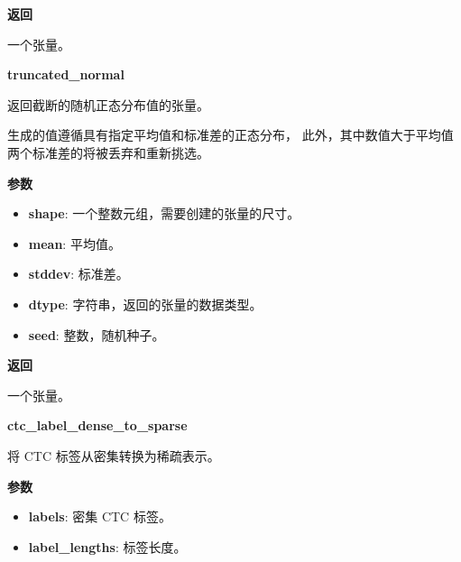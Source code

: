 \textbf{返回}

一个张量。


\textbf{truncated\_normal}\label{truncatedux5fnormal}

\begin{Shaded}
\begin{Highlighting}[]
\OperatorTok{=}\OperatorTok{=}\OperatorTok{=}\OperatorTok{=}\NormalTok{)}
\end{Highlighting}
\end{Shaded}

返回截断的随机正态分布值的张量。

生成的值遵循具有指定平均值和标准差的正态分布，
此外，其中数值大于平均值两个标准差的将被丢弃和重新挑选。

\textbf{参数}

\begin{itemize}
\tightlist
\item
  \textbf{shape}: 一个整数元组，需要创建的张量的尺寸。
\item
  \textbf{mean}: 平均值。
\item
  \textbf{stddev}: 标准差。
\item
  \textbf{dtype}: 字符串，返回的张量的数据类型。
\item
  \textbf{seed}: 整数，随机种子。
\end{itemize}

\textbf{返回}

一个张量。


\textbf{ctc\_label\_dense\_to\_sparse}\label{ctcux5flabelux5fdenseux5ftoux5fsparse}

\begin{Shaded}
\begin{Highlighting}[]
\end{Highlighting}
\end{Shaded}

将 CTC 标签从密集转换为稀疏表示。

\textbf{参数}

\begin{itemize}
\tightlist
\item
  \textbf{labels}: 密集 CTC 标签。
\item
  \textbf{label\_lengths}: 标签长度。
\end{itemize}

